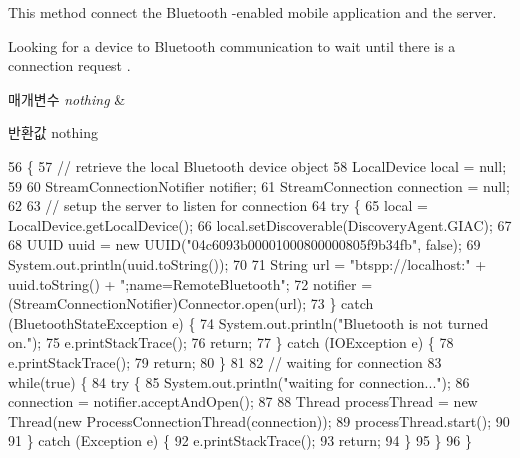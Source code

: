 This method connect the Bluetooth -\/enabled mobile application and the server. 

Looking for a device to Bluetooth communication to wait until there is a connection request . 
\begin{DoxyParams}{매개변수}
{\em nothing} & \\
\hline
\end{DoxyParams}
\begin{DoxyReturn}{반환값}
nothing 
\end{DoxyReturn}

\begin{DoxyCode}
56                                      \{
57         \textcolor{comment}{// retrieve the local Bluetooth device object}
58         LocalDevice local = null;
59         
60         StreamConnectionNotifier notifier;
61         StreamConnection connection = null;
62         
63         \textcolor{comment}{// setup the server to listen for connection}
64         \textcolor{keywordflow}{try} \{
65             local = LocalDevice.getLocalDevice();
66             local.setDiscoverable(DiscoveryAgent.GIAC);
67             
68             UUID uuid = \textcolor{keyword}{new} UUID(\textcolor{stringliteral}{"04c6093b00001000800000805f9b34fb"}, \textcolor{keyword}{false});
69             System.out.println(uuid.toString());
70             
71             String url = \textcolor{stringliteral}{"btspp://localhost:"} + uuid.toString() + \textcolor{stringliteral}{";name=RemoteBluetooth"};
72             notifier = (StreamConnectionNotifier)Connector.open(url);
73         \} \textcolor{keywordflow}{catch} (BluetoothStateException e) \{
74             System.out.println(\textcolor{stringliteral}{"Bluetooth is not turned on."});
75             e.printStackTrace();
76             \textcolor{keywordflow}{return};
77         \} \textcolor{keywordflow}{catch} (IOException e) \{
78             e.printStackTrace();
79             \textcolor{keywordflow}{return};
80         \}
81         
82         \textcolor{comment}{// waiting for connection}
83         \textcolor{keywordflow}{while}(\textcolor{keyword}{true}) \{
84             \textcolor{keywordflow}{try} \{
85                 System.out.println(\textcolor{stringliteral}{"waiting for connection..."});
86                 connection = notifier.acceptAndOpen();
87                 
88                 Thread processThread = \textcolor{keyword}{new} Thread(\textcolor{keyword}{new} ProcessConnectionThread(connection));
89                 processThread.start();
90                 
91             \} \textcolor{keywordflow}{catch} (Exception e) \{
92                 e.printStackTrace();
93                 \textcolor{keywordflow}{return};
94             \}
95         \}
96     \}
\end{DoxyCode}


